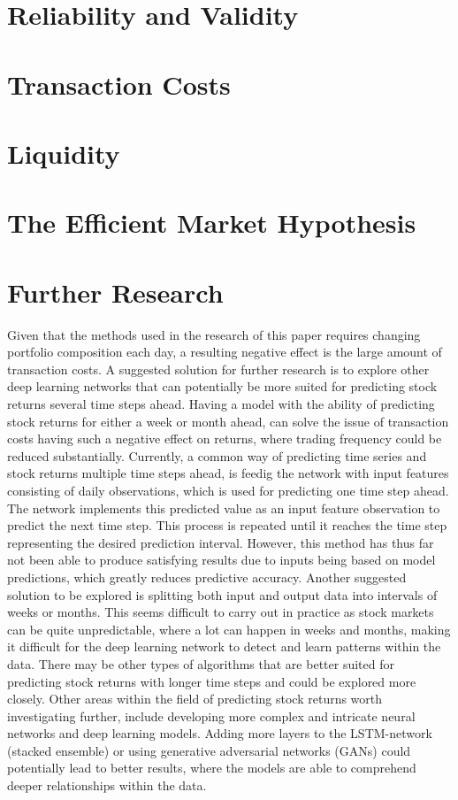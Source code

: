 \section{Reliability and Validity}

\section{Transaction Costs}

\section{Liquidity}

\section{The Efficient Market Hypothesis}

\section{Further Research}
Given that the methods used in the research of this paper requires changing portfolio composition each day, a resulting negative effect is the large amount of transaction costs. A suggested solution for further research is to explore other deep learning networks that can potentially be more suited for predicting stock returns several time steps ahead. Having a model with the ability of predicting stock returns for either a week or month ahead, can solve the issue of transaction costs having such a negative effect on returns, where trading frequency could be reduced substantially. Currently, a common way of predicting time series and stock returns multiple time steps ahead, is feedig the network with input features consisting of daily observations, which is used for predicting one time step ahead. The network implements this predicted value as an input feature observation to predict the next time step. This process is repeated until it reaches the time step representing the desired prediction interval. However, this method has thus far not been able to produce satisfying results due to inputs being based on model predictions, which greatly reduces predictive accuracy. Another suggested solution to be explored is splitting both input and output data into intervals of weeks or months. This seems difficult to carry out in practice as stock markets can be quite unpredictable, where a lot can happen in weeks and months, making it difficult for the deep learning network to detect and learn patterns within the data. There may be other types of algorithms that are better suited for predicting stock returns with longer time steps and could be explored more closely. Other areas within the field of predicting stock returns worth investigating further, include developing more complex and intricate neural networks and deep learning models. Adding more layers to the LSTM-network (stacked ensemble) or using generative adversarial networks (GANs) could potentially lead to better results, where the models are able to comprehend deeper relationships within the data.  

